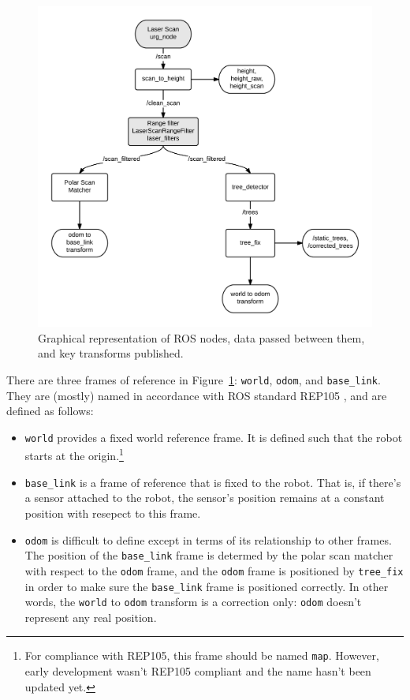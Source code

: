 \documentclass[12pt,oneside,a4paper]{book}
\begin{document}
\begin{figure}[h!]
  \centering
  \includegraphics[width=\textwidth]{figs/roschain}
  \caption{Graphical representation of ROS nodes, data passed between
    them, and key transforms published.}
  \label{fig:roschain}
\end{figure}
\newpage
There are three frames of reference in Figure~\ref{fig:roschain}:
\texttt{world}, \texttt{odom}, and \texttt{base\_link}. They are
(mostly) named in accordance with ROS standard REP105 \cite{rep105},
and are defined as follows:
\begin{itemize}
\item \texttt{world} provides a fixed world reference frame. It is
  defined such that the robot starts at the origin.\footnote{For
    compliance with REP105, this frame should be named
    \texttt{map}. However, early development wasn't REP105 compliant
    and the name hasn't been updated yet.}
\item \texttt{base\_link} is a frame of reference that is fixed to the
  robot. That is, if there's a sensor attached to the robot, the
  sensor's position remains at a constant position with resepect to
  this frame.
\item \texttt{odom} is difficult to define except in terms of its
  relationship to other frames. The position of the
  \texttt{base\_link} frame is determed by the polar scan matcher with
  respect to the \texttt{odom} frame, and the \texttt{odom} frame is
  positioned by \texttt{tree\_fix} in order to make sure the
  \texttt{base\_link} frame is positioned correctly. In other words,
  the \texttt{world} to \texttt{odom} transform is a correction only:
  \texttt{odom} doesn't represent any real position.
\end{itemize}
\end{document}
